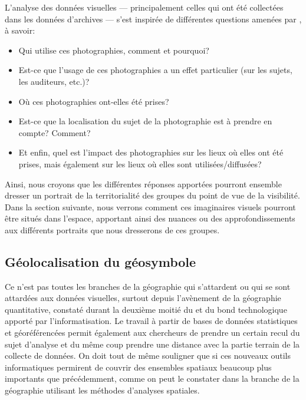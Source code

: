 

L'analyse des données visuelles --- principalement celles qui ont été collectées dans les données d'archives --- s'est inspirée de différentes questions amenées par \citet[157]{Rose2008}, à savoir:
\begin{itemize}
	\item Qui utilise ces photographies, comment et pourquoi?
	\item Est-ce que l'usage de ces photographies a un effet particulier (sur les sujets, les auditeurs, etc.)?
	\item Où ces photographies ont-elles été prises?
	\item Est-ce que la localisation du sujet de la photographie est à prendre en compte? Comment?
	\item Et enfin, quel est l'impact des photographies sur les lieux où elles ont été prises, mais également sur les lieux où elles sont utilisées/diffusées?
\end{itemize}

Ainsi, nous croyons que les différentes réponses apportées pourront ensemble dresser un portrait de la territorialité des groupes \lgbt{} du point de vue de la visibilité. 
Dans la section suivante, nous verrons comment ces imaginaires visuels pourront être situés dans l'espace, apportant ainsi des nuances ou des approfondissements aux différents portraits que nous dresserons de ces groupes.

\subsection{Géolocalisation du géosymbole}
\label{sub:g_olocalisation_du_sybole}
Ce n'est pas toutes les branches de la géographie qui s'attardent ou qui se sont attardées aux données visuelles, surtout depuis l'avènement de la géographie quantitative, constaté durant la deuxième moitié du  et du bond technologique apporté par l'informatisation. 
Le travail à partir de bases de données statistiques et géoréférencées permit également aux chercheurs de prendre un certain recul du sujet d'analyse et du même coup prendre une distance avec la partie terrain de la collecte de données. 
On doit tout de même souligner que si ces nouveaux outils informatiques permirent de couvrir des ensembles spatiaux beaucoup plus importants que précédemment, comme on peut le constater dans la branche de la géographie utilisant les méthodes d'analyses spatiales.

